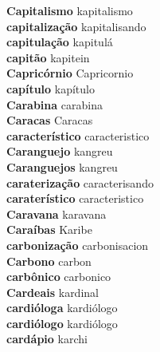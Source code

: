 \textbf{ Capitalismo  } kapitalismo \\
\textbf{ capitalização  } kapitalisando \\
\textbf{ capitulação  } kapitulá \\
\textbf{ capitão  } kapitein \\
\textbf{ Capricórnio  } Capricornio \\
\textbf{ capítulo  } kapítulo \\
\textbf{ Carabina  } carabina \\
\textbf{ Caracas  } Caracas \\
\textbf{ característico  } caracteristico \\
\textbf{ Caranguejo  } kangreu \\
\textbf{ Caranguejos  } kangreu \\
\textbf{ caraterização  } caracterisando \\
\textbf{ caraterístico  } caracteristico \\
\textbf{ Caravana  } karavana \\
\textbf{ Caraíbas  } Karibe \\
\textbf{ carbonização  } carbonisacion \\
\textbf{ Carbono  } carbon \\
\textbf{ carbônico  } carbonico \\
\textbf{ Cardeais  } kardinal \\
\textbf{ cardióloga  } kardiólogo \\
\textbf{ cardiólogo  } kardiólogo \\
\textbf{ cardápio  } karchi \\
